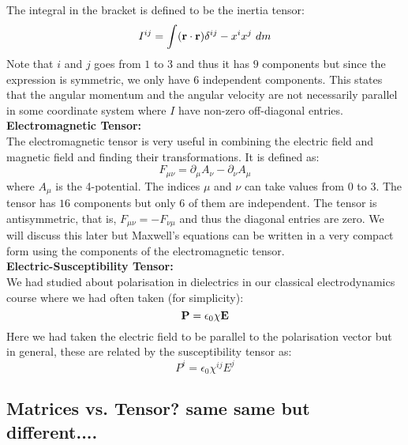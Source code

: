 The integral in the bracket is defined to be the inertia tensor:
$$I^{ij} = \int (\veb{r}\cdot \veb{r})\tensor*{\delta}{^i^j} - x^ix^j \ dm$$
Note that $i$ and $j$ goes from $1$ to $3$ and thus it has $9$ components but since the expression is symmetric, we only have $6$ independent components. This states that the angular momentum and the angular velocity are not necessarily parallel in some coordinate system where $I$ have non-zero off-diagonal entries.\\[0.3cm]
\textbf{Electromagnetic Tensor:}\\[0.3cm]
The electromagnetic tensor is very useful in combining the electric field and magnetic field and finding their transformations. It is defined as:
$$F_{\mu\nu} = \partial_\mu A_\nu - \partial_\nu A_\mu$$
where $A_\mu$ is the 4-potential. The indices $\mu$ and $\nu$ can take values from $0$ to $3$. The tensor has $16$ components but only $6$ of them are independent. The tensor is antisymmetric, that is, $F_{\mu\nu} = -F_{\nu\mu}$ and thus the diagonal entries are zero. We will discuss this later but Maxwell's equations can be written in a very compact form using the components of the electromagnetic tensor.\\[0.3cm]
\textbf{Electric-Susceptibility Tensor:}\\[0.3cm]
We had studied about polarisation in dielectrics in our classical electrodynamics course where we had often taken (for simplicity):
$$\boldsymbol{\mathbf{P}} = \epsilon_0\chi\boldsymbol{\mathbf{E}}$$
Here we had taken the electric field to be parallel to the polarisation vector but in general, these are related by the susceptibility tensor as:
$$P^i = \epsilon_0\chi^{ij}E^{j}$$
\subsection{Matrices vs. Tensor? same same but different....}
